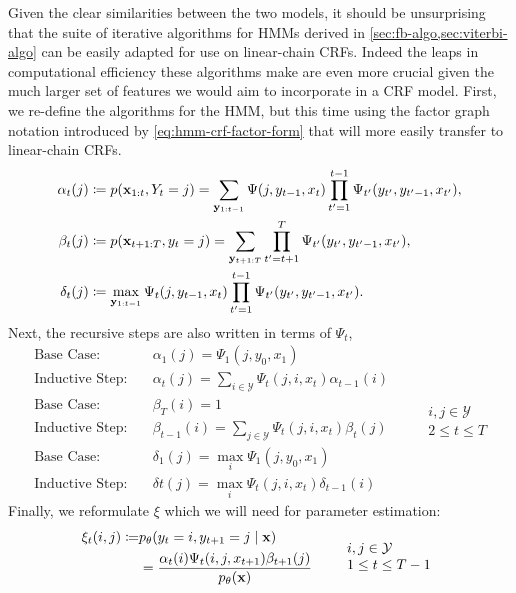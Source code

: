 \documentclass[../main.tex]{subfiles}
\begin{document}
Given the clear similarities between the two models, it should be unsurprising that the suite of iterative algorithms for HMMs derived in \cref{sec:fb-algo,sec:viterbi-algo} can be easily adapted for use on linear-chain CRFs.
Indeed the leaps in computational efficiency these algorithms make are even more crucial given the much larger set of features we would aim to incorporate in a CRF model.
First, we re-define the algorithms for the HMM, but this time using the factor graph notation introduced by \cref{eq:hmm-crf-factor-form} that will more easily transfer to linear-chain CRFs.
\begin{align*}
    \alpha_t(j) &\coloneqq p(\mathbf{x}_{1:t},Y_t=j) = \sum_{\mathbf{y}_{1:t-1}} \Psi(j,y_{t-1},x_t) \prod_{t'=1}^{t-1} \Psi_{t'}(y_{t'},y_{t'-1},x_{t'}), \\
    \beta_t(j) &\coloneqq p(\mathbf{x}_{t+1:T},y_t=j) = \sum_{\mathbf{y}_{t+1:T}} \prod_{t'=t+1}^{T} \Psi_{t'}(y_{t'},y_{t'-1},x_{t'}), \\
    \delta_t(j) &\coloneqq  \max_{\mathbf{y}_{1:t-1}} \Psi_t(j,y_{t-1},x_t) \prod_{t'=1}^{t-1} \Psi_{t'}(y_{t'},y_{t'-1},x_{t'}).
\end{align*}
Next, the recursive steps are also written in terms of $\Psi_t$,
\begin{equation*}
    \begin{aligned}
        \text{Base Case:} & \quad \alpha_1(j) = \Psi_1(j,y_0,x_1) \\
        \text{Inductive Step:} & \quad \alpha_t(j) = \sum_{i \in \mathcal{Y}} \Psi_t(j,i,x_t) \alpha_{t-1}(i) \\
        \text{Base Case:} & \quad \beta_T(i) = 1 \\
        \text{Inductive Step:} & \quad \beta_{t-1}(i) = \sum_{j \in \mathcal{Y}} \Psi_{t} (j,i,x_{t})\beta_{t}(j) \\
        \text{Base Case:} & \quad \delta_1(j) = \max_i \Psi_1(j,y_0,x_1) \\
        \text{Inductive Step:} & \quad \delta{t}(j) = \max_i \Psi_t(j,i,x_t) \delta_{t-1}(i)
    \end{aligned} \qquad 
        \begin{array}{lr}
            i,j \in \mathcal{Y} \\
            2 \leq t \leq T
        \end{array}
\end{equation*}
Finally, we reformulate $\xi$ which we will need for parameter estimation:
\begin{align*}
    \begin{aligned}
    \xi_t(i,j) \coloneqq & p_\theta(y_t = i, y_{t+1} = j \mid \mathbf{x}) \\
    &= \frac{\alpha_{t}(i)\Psi_t(i,j,x_{t+1})\beta_{t+1}(j)}{p_\theta(\mathbf{x})}
    \end{aligned} \qquad \begin{array}{lr}
            i,j \in \mathcal{Y} \\
            1 \leq t \leq T-1
        \end{array}
\end{align*}
\end{document}
